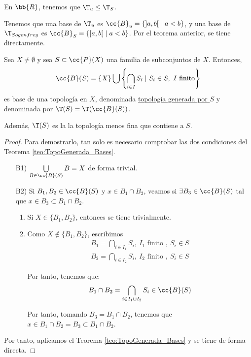 \begin{ejemplo}
    En $\bb{R}$, tenemos que $\T_u\leq \T_S$.

    Tenemos que una base de $\T_u$ es $\cc{B}_u=\{]a,b[~\mid a<b\}$, y una base de $\T_{Sogenfrey}$ es $\cc{B}_S=\{[a,b[~\mid a<b\}$. Por el teorema anterior, se tiene directamente.
\end{ejemplo}

\begin{prop}\label{teo:TopoGenerada_Conjunto}
    Sea $X\neq \emptyset$ y sea $S\subset \cc{P}(X)$ una familia de subconjuntos de $X$. Entonces,
    \begin{equation*}
        \cc{B}(S)=\{X\}\bigcup \left\{\bigcap_{i\in I}S_i \mid S_i\in S,~I\text{ finito}\right\}
    \end{equation*}
    es base de una topología en $X$, denominada \ul{topología generada por $S$} y denominada por $\T(S)=\T(\cc{B}(S))$.

    Además, $\T(S)$ es la la topología menos fina que contiene a $S$.
\end{prop}
\begin{proof}
    Para demostrarlo, tan solo es necesario comprobar las dos condiciones del Teorema \ref{teo:TopoGenerada_Bases}.
    \begin{enumerate}
        \item[B1)] $\bigcup\limits_{B\in \cc{B}(S)} B=X$ de forma trivial.
        \item[B2)] Si $B_1, B_2\in \cc{B}(S)$ y $x\in B_1\cap B_2$, veamos si $\exists B_3\in \cc{B}(S)$ tal que $x\in B_3\subset B_1\cap B_2$.
        \begin{enumerate}
            \item Si $X\in \{B_1,B_2\}$, entonces se tiene trivialmente.
            \item Como $X\notin \{B_1,B_2\}$, escribimos
            \begin{gather*}
                B_1=\bigcap\limits_{i\in I_1}S_i,~I_1 \text{ finito },~S_i\in S\\
                B_2=\bigcap\limits_{i\in I_2}S_i,~I_2 \text{ finito },~S_i\in S
            \end{gather*}

            Por tanto, tenemos que:
            $$B_1\cap B_2 = \bigcap_{i\in I_1\cup I_2}S_i\in \cc{B}(S)$$

            Por tanto, tomando $B_3=B_1\cap B_2$, tenemos que $x\in B_1\cap B_2=B_3\subset B_1\cap B_2$.
        \end{enumerate}
    \end{enumerate}

    Por tanto, aplicamos el Teorema \ref{teo:TopoGenerada_Bases} y se tiene de forma directa.
\end{proof}

